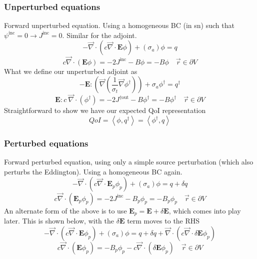 \documentclass{article}
\newcommand{\vr}{\vec{r}}
\newcommand{\bra}{\left\langle}
\newcommand{\ket}{\right\rangle}
\newcommand{\vdiv}{\vec{\nabla} \cdot}
\newcommand{\vgrad}{\vec{\nabla}}
\newcommand{\bound}{\partial V}
\newcommand{\Edd}{\mathbf{E}}
\newcommand{\sigt}{\sigma_t}
\newcommand{\siga}{\sigma_a}
\newcommand{\isigt}{c}
\newcommand{\scalSource}{q}
\newcommand{\scalResp}{q^\dag}
\newcommand{\qoi}{QoI}
\begin{document}
\subsubsection{Unperturbed equations}
Forward unperturbed equation. Using a homogeneous BC (in sn) such that $\psi^{\text{inc}}=0 \to J^{\text{inc}}=0$. Similar for the adjoint.
\begin{equation}
- \vdiv \left(\isigt\vdiv \Edd \phi \right) + (\siga )\phi = \scalSource 
\end{equation}
\begin{equation}
\isigt   \vec{\nabla} \cdot \left(\Edd \phi \right)  = - 2J^{\text{inc}} - B \phi =  - B \phi \quad \vr \in \bound
\end{equation}
What we define our unperturbed adjoint as
\begin{equation}
- \Edd : \left( \vgrad \left( \frac{1}{\sigt}\vgrad \phi^\dag \right) \right) + \siga \phi^\dag = \scalResp
\end{equation}
\begin{equation}
\Edd : \isigt \ \vec{\nabla} \cdot \left( \phi^\dag \right)  = - 2J^{\dag \text{out}} - B \phi^\dag =  - B \phi^\dag \quad \vr \in \bound
\end{equation}
Straightforward to show we have our expected QoI representation
\begin{equation}
\qoi=\bra \phi , \scalResp \ket = \bra \phi^\dag , \scalSource\ket 
\end{equation}


\subsubsection{Perturbed equations}
Forward perturbed equation, using only a simple source perturbation (which also perturbs the Eddington). Using a homogeneous BC again.
\begin{equation}
- \vdiv \left(\isigt\vdiv \Edd_p \phi_p \right) + (\siga )\phi = \scalSource + \delta \scalSource 
\end{equation}
\begin{equation}
\isigt   \vec{\nabla} \cdot \left(\Edd_p \phi_p \right)  = - 2J^{\text{inc}} - B_p \phi_p =  - B_p \phi_p \quad \vr \in \bound
\end{equation}
An alternate form of the above is to use $\Edd_p = \Edd + \delta \Edd$, which comes into play later. This is shown below, with the $\delta \Edd$ term moves to the RHS
\begin{equation}
- \vdiv \left(\isigt\vdiv \Edd \phi_p \right) + (\siga )\phi = \scalSource + \delta \scalSource +  \vdiv \left(\isigt\vdiv \delta \Edd \phi_p \right) 
\end{equation}
\begin{equation}
\isigt   \vec{\nabla} \cdot \left(\Edd \phi_p \right)  =   - B_p \phi_p  - \isigt   \vec{\nabla} \cdot \left(\delta \Edd \phi_p \right) \quad \vr \in \bound
\end{equation}
\end{document}
